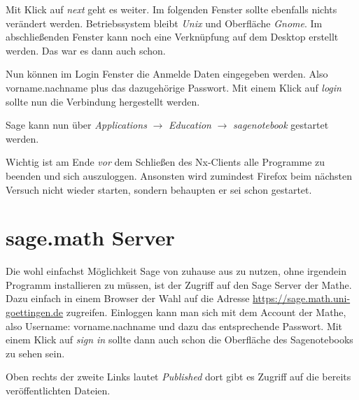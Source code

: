 \documentclass[a4paper,10pt,DIV15]{scrartcl}
\begin{document}
Mit Klick auf \emph{next} geht es weiter. Im folgenden Fenster sollte ebenfalls nichts verändert werden.
 Betriebssystem bleibt \emph{Unix} und Oberfläche \emph{Gnome}. 
Im abschließenden Fenster kann noch eine Verknüpfung auf dem Desktop erstellt werden. Das war es dann auch schon.

Nun können im Login Fenster die Anmelde Daten eingegeben werden. Also vorname.nachname plus das dazugehörige Passwort. Mit einem Klick auf 
\emph{login} sollte nun die Verbindung hergestellt werden. 

Sage kann nun über \emph{Applications} $\to$ \emph{Education} $\to$ \emph{sagenotebook} gestartet werden. 

Wichtig ist am Ende \emph{vor} dem Schließen des Nx-Clients alle Programme zu beenden und sich auszuloggen. Ansonsten wird zumindest Firefox beim
nächsten Versuch nicht wieder starten, sondern behaupten er sei schon gestartet. 
\section{sage.math Server}
Die wohl einfachst Möglichkeit Sage von zuhause aus zu nutzen, ohne irgendein Programm installieren zu müssen, ist der Zugriff auf den Sage Server 
der Mathe. Dazu einfach in einem Browser der Wahl auf die Adresse \url{https://sage.math.uni-goettingen.de} zugreifen. Einloggen kann man sich mit
dem Account der Mathe, also Username: vorname.nachname und dazu das entsprechende Passwort. Mit einem Klick auf \emph{sign in} sollte dann auch
schon die Oberfläche des Sagenotebooks zu sehen sein. 

Oben rechts der zweite Links lautet \emph{Published} dort gibt es Zugriff auf die bereits veröffentlichten Dateien.
\end{document}

